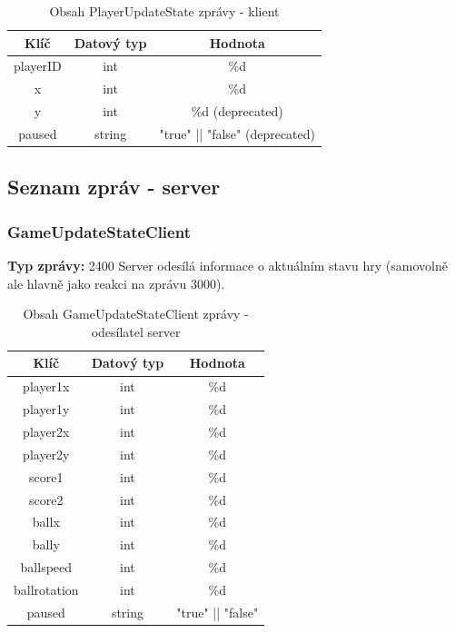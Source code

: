 \documentclass[12pt, a4paper]{article}
\begin{document}
    \begin{table}[H]
        \centering
        \begin{tabular}{|c|c|c|}
            \hline
            Klíč & Datový typ & Hodnota \\
            \hline
            \hline
            playerID & int & \%d \\
            \hline
            x & int & \%d \\
            \hline
            y & int & \%d (deprecated) \\
            \hline
            paused & string & "true" || "false" (deprecated) \\
            \hline
        \end{tabular}
        \caption{Obsah PlayerUpdateState zprávy - klient}
    \end{table}

\newpage
\subsection{Seznam zpráv - server}

\subsubsection{GameUpdateStateClient}
\textbf{Typ zprávy: } 2400 \newline
Server odesílá informace o aktuálním stavu hry (samovolně ale hlavně jako reakci na zprávu 3000). \newline

    \begin{table}[H]
        \centering
        \begin{tabular}{|c|c|c|}
            \hline
            Klíč & Datový typ & Hodnota \\
            \hline
            \hline
            player1x & int & \%d \\
            \hline
            player1y & int & \%d \\
            \hline
            player2x & int & \%d \\
            \hline
            player2y & int & \%d \\
            \hline
            score1 & int & \%d \\
            \hline
            score2 & int & \%d \\
            \hline
            ballx & int & \%d \\
            \hline
            bally & int & \%d \\
            \hline
            ballspeed & int & \%d \\
            \hline
            ballrotation & int & \%d \\
            \hline
            paused & string & "true" || "false" \\
            \hline
        \end{tabular}
        \caption{Obsah GameUpdateStateClient zprávy - odesílatel server}
    \end{table}
\end{document}
